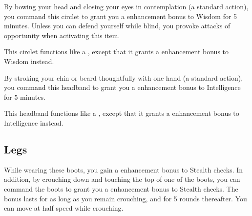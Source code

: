  By bowing your head and closing your eyes in contemplation (a standard action), you command this circlet to grant you a  enhancement bonus to Wisdom for 5 minutes. Unless you can defend yourself while blind, you provoke attacks of opportunity when activating this item.


 This circlet functions like a , except that it grants a  enhancement bonus to Wisdom instead.


 By stroking your chin or beard thoughtfully with one hand (a standard action), you command this headband to grant you a  enhancement bonus to Intelligence for 5 minutes.


 This headband functions like a , except that it grants a  enhancement bonus to Intelligence instead.


\subsection{Legs}

 While wearing these boots, you gain a  enhancement bonus to Stealth checks. In addition, by crouching down and touching the top of one of the boots, you can command the boots to grant you a  enhancement bonus to Stealth checks. The bonus lasts for as long as you remain crouching, and for 5 rounds thereafter. You can move at half speed while crouching. 


